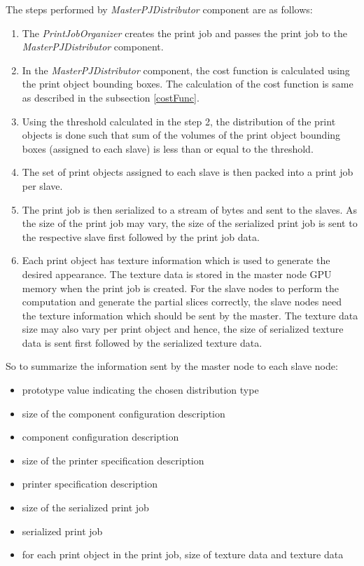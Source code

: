 The steps performed by \textit{MasterPJDistributor} component are as follows: 
\begin{enumerate}
\item The \textit{PrintJobOrganizer} creates the print job and passes the print job to the \textit{MasterPJDistributor} component. 
\item In the \textit{MasterPJDistributor} component, the cost function is calculated using the print object bounding boxes. The calculation of the cost function is same as described in the subsection \ref{costFunc}.
\item Using the threshold calculated in the step 2, the distribution of the print objects is done such that sum of the volumes of the print object bounding boxes (assigned to each slave) is less than or equal to the threshold.
\item The set of print objects assigned to each slave is then packed into a print job per slave. 
\item The print job is then serialized to a stream of bytes and sent to the slaves. As the size of the print job may vary, the size of the serialized print job is sent to the respective slave first followed by the print job data. 
\item Each print object has texture information which is used to generate the desired appearance. The texture data is stored in the master node GPU memory when the print job is created. For the slave nodes to perform the computation and generate the partial slices correctly, the slave nodes need the texture information which should be sent by the master. The texture data size may also vary per print object and hence, the size of serialized texture data is sent first followed by the serialized texture data.   
\end{enumerate}

So to summarize the information sent by the master node to each slave node:
\begin{itemize}
\item prototype value indicating the chosen distribution type
\item size of the component configuration description 
\item component configuration description
\item size of the printer specification description 
\item printer specification description
\item size of the serialized print job 
\item serialized print job 
\item for each print object in the print job, size of texture data and texture data  
\end{itemize}

